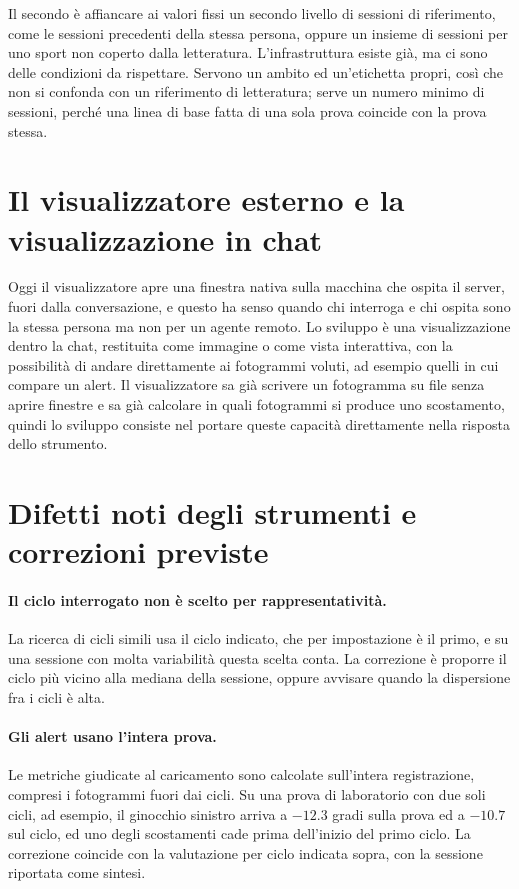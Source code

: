 Il secondo è affiancare ai valori fissi un secondo livello di sessioni di
riferimento, come le
sessioni precedenti della stessa persona, oppure un insieme di sessioni per uno
sport non coperto dalla letteratura. L'infrastruttura esiste già, ma ci sono delle condizioni da rispettare. 
Servono un ambito ed un'etichetta propri, così che non si confonda con un
riferimento di letteratura;  serve un numero minimo di
sessioni, perché una linea di base fatta di una sola prova coincide con la prova stessa.


\section{Il visualizzatore esterno e la visualizzazione in chat}
\label{sec:ch6:visualizzazione}

Oggi il visualizzatore apre una finestra nativa sulla macchina che ospita il
server, fuori dalla conversazione, e questo ha senso quando chi interroga e chi
ospita sono la stessa persona ma non per un agente remoto. Lo sviluppo è una
visualizzazione dentro la chat, restituita come immagine o come vista
interattiva, con la possibilità di andare direttamente ai fotogrammi voluti, ad
esempio quelli in cui compare un alert. Il visualizzatore sa già scrivere un
fotogramma su file senza aprire finestre e sa già calcolare in quali fotogrammi si
produce uno scostamento, quindi lo sviluppo consiste nel portare queste capacità direttamente 
nella risposta dello strumento.

\section{Difetti noti degli strumenti e correzioni previste}
\label{sec:ch6:difetti}

\paragraph{Il ciclo interrogato non è scelto per rappresentatività.} La ricerca di
cicli simili usa il ciclo indicato, che per impostazione è il primo, e su una
sessione con molta variabilità questa scelta conta. La correzione è proporre il
ciclo più vicino alla mediana della sessione, oppure avvisare quando la
dispersione fra i cicli è alta.

\paragraph{Gli alert usano l'intera prova.} Le metriche giudicate al caricamento
sono calcolate sull'intera registrazione, compresi i fotogrammi fuori dai cicli.
Su una prova di laboratorio con due soli cicli, ad esempio, il ginocchio sinistro
arriva a $-12.3$ gradi sulla prova ed a $-10.7$ sul ciclo, ed uno degli
scostamenti cade prima dell'inizio del primo ciclo. La correzione coincide con la
valutazione per ciclo indicata sopra, con la sessione riportata come sintesi.


